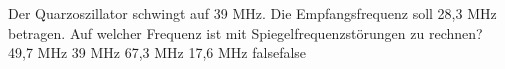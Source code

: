     {Der Quarzoszillator schwingt auf 39 MHz. Die Empfangsfrequenz soll 28,3 MHz betragen. Auf welcher Frequenz ist mit Spiegelfrequenzstörungen zu rechnen?}
    {49,7 MHz}
    {39 MHz}
    {67,3 MHz}
    {17,6 MHz}
    {false}{false}